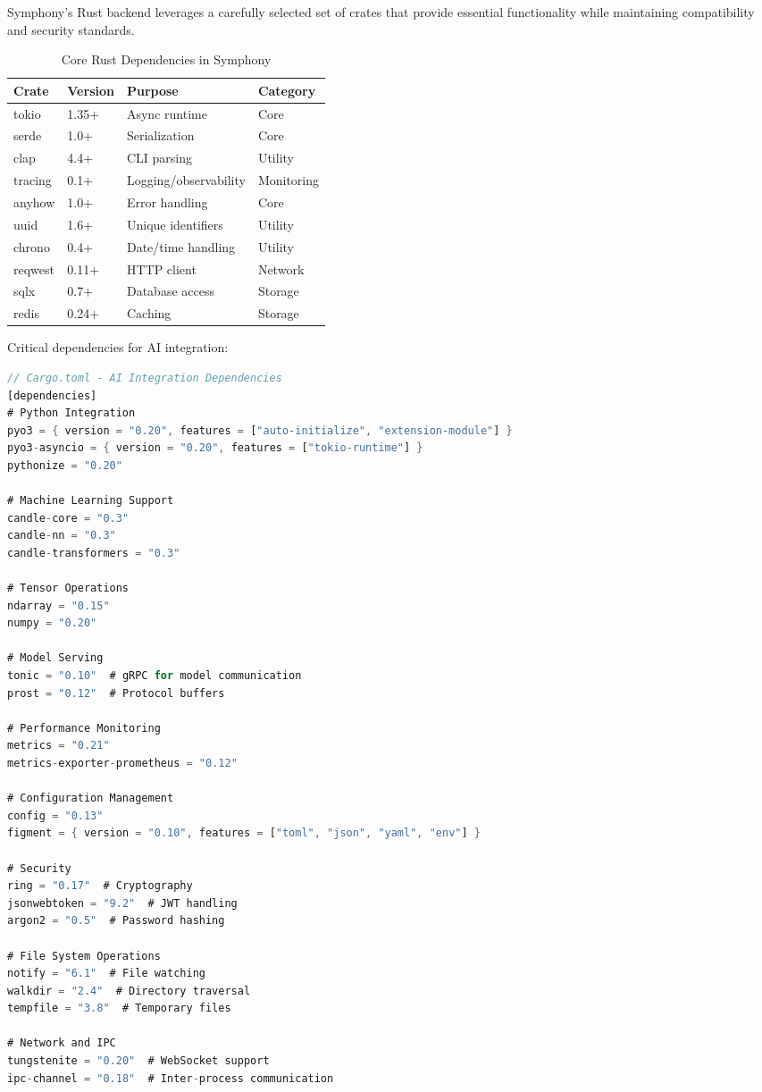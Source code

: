 Symphony's Rust backend leverages a carefully selected set of crates that provide essential functionality while maintaining compatibility and security standards.

\begin{table}[h]
\centering
\caption{Core Rust Dependencies in Symphony}
\begin{tabular}{@{}llll@{}}
\toprule
\textbf{Crate} & \textbf{Version} & \textbf{Purpose} & \textbf{Category} \\
\midrule
tokio & 1.35+ & Async runtime & Core \\
serde & 1.0+ & Serialization & Core \\
clap & 4.4+ & CLI parsing & Utility \\
tracing & 0.1+ & Logging/observability & Monitoring \\
anyhow & 1.0+ & Error handling & Core \\
uuid & 1.6+ & Unique identifiers & Utility \\
chrono & 0.4+ & Date/time handling & Utility \\
reqwest & 0.11+ & HTTP client & Network \\
sqlx & 0.7+ & Database access & Storage \\
redis & 0.24+ & Caching & Storage \\
\bottomrule
\end{tabular}
\end{table}

Critical dependencies for AI integration:

\begin{lstlisting}[language=Rust, caption=AI-Specific Dependencies Configuration]
// Cargo.toml - AI Integration Dependencies
[dependencies]
# Python Integration
pyo3 = { version = "0.20", features = ["auto-initialize", "extension-module"] }
pyo3-asyncio = { version = "0.20", features = ["tokio-runtime"] }
pythonize = "0.20"

# Machine Learning Support
candle-core = "0.3"
candle-nn = "0.3"
candle-transformers = "0.3"

# Tensor Operations
ndarray = "0.15"
numpy = "0.20"

# Model Serving
tonic = "0.10"  # gRPC for model communication
prost = "0.12"  # Protocol buffers

# Performance Monitoring
metrics = "0.21"
metrics-exporter-prometheus = "0.12"

# Configuration Management
config = "0.13"
figment = { version = "0.10", features = ["toml", "json", "yaml", "env"] }

# Security
ring = "0.17"  # Cryptography
jsonwebtoken = "9.2"  # JWT handling
argon2 = "0.5"  # Password hashing

# File System Operations
notify = "6.1"  # File watching
walkdir = "2.4"  # Directory traversal
tempfile = "3.8"  # Temporary files

# Network and IPC
tungstenite = "0.20"  # WebSocket support
ipc-channel = "0.18"  # Inter-process communication
\end{lstlisting}

